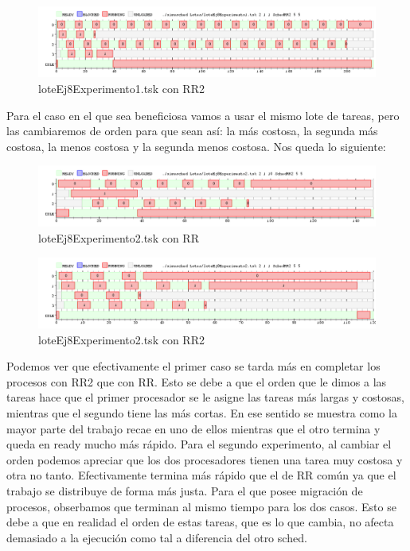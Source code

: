 \begin{figure}[H]
  \centering
    \includegraphics[width=1.1\textwidth]{imagenes/Ej8Experimento1.png}
  \caption{loteEj8Experimento1.tsk con RR2}
\end{figure}

Para el caso en el que sea beneficiosa vamos a usar el mismo lote de tareas, pero las cambiaremos de orden para que sean así: 
la más costosa, la segunda más costosa, la menos costosa y la segunda menos costosa. Nos queda lo siguiente:

\begin{figure}[H]
  \centering
    \includegraphics[width=1.1\textwidth]{imagenes/Ej8Experimento4.png}
  \caption{loteEj8Experimento2.tsk con RR}
\end{figure}

\begin{figure}[H]
  \centering
    \includegraphics[width=1.1\textwidth]{imagenes/Ej8Experimento2.png}
  \caption{loteEj8Experimento2.tsk con RR2}
\end{figure}

Podemos ver que efectivamente el primer caso se tarda más en completar los procesos con RR2 que con RR. Esto se debe a que el orden que le dimos a las tareas hace que el primer
procesador se le asigne las tareas más largas y costosas, mientras que el segundo tiene las más cortas. En ese sentido se muestra como la mayor parte del trabajo recae en uno de ellos
mientras que el otro termina y queda en ready mucho más rápido. Para el segundo experimento, al cambiar el orden podemos apreciar que los dos procesadores tienen una tarea muy costosa y otra no tanto. Efectivamente termina más rápido que el de RR común ya que el trabajo se distribuye de forma más justa. Para el que posee migración de procesos, obserbamos que terminan al mismo tiempo para los dos casos. Esto se debe a que en realidad el orden de estas tareas, que es lo que cambia, no afecta demasiado a la ejecución como tal a diferencia del otro sched.

